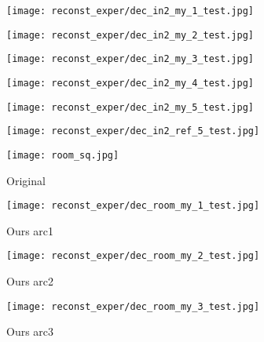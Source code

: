 \begin{figure}[H]
\begin{subfigure}[b]{0.13\linewidth}
	\end{subfigure}
	\begin{subfigure}[b]{0.13\linewidth}
		\texttt{[image: reconst\_exper/dec\_in2\_my\_1\_test.jpg]} %
	\end{subfigure}
	\begin{subfigure}[b]{0.13\linewidth}
		\texttt{[image: reconst\_exper/dec\_in2\_my\_2\_test.jpg]} %
	\end{subfigure}
	\begin{subfigure}[b]{0.13\linewidth}
		\texttt{[image: reconst\_exper/dec\_in2\_my\_3\_test.jpg]} %
	\end{subfigure}
	\begin{subfigure}[b]{0.13\linewidth}
		\texttt{[image: reconst\_exper/dec\_in2\_my\_4\_test.jpg]} %
	\end{subfigure}
	\begin{subfigure}[b]{0.13\linewidth}
		\texttt{[image: reconst\_exper/dec\_in2\_my\_5\_test.jpg]} %
	\end{subfigure}
	\begin{subfigure}[b]{0.13\linewidth}
		\texttt{[image: reconst\_exper/dec\_in2\_ref\_5\_test.jpg]} %
	\end{subfigure}
	\centering
	\begin{subfigure}[b]{0.13\linewidth}
		\texttt{[image: room\_sq.jpg]} %
		\caption{Original}
	\end{subfigure}
	\begin{subfigure}[b]{0.13\linewidth}
		\texttt{[image: reconst\_exper/dec\_room\_my\_1\_test.jpg]} %
		\caption{Ours arc1}
	\end{subfigure}
	\begin{subfigure}[b]{0.13\linewidth}
		\texttt{[image: reconst\_exper/dec\_room\_my\_2\_test.jpg]} %
		\caption{Ours arc2}
	\end{subfigure}
	\begin{subfigure}[b]{0.13\linewidth}
		\texttt{[image: reconst\_exper/dec\_room\_my\_3\_test.jpg]} %
		\caption{Ours arc3}
	\end{subfigure}
	\begin{subfigure}[b]{0.13\linewidth}

\end{subfigure}
\end{figure}
